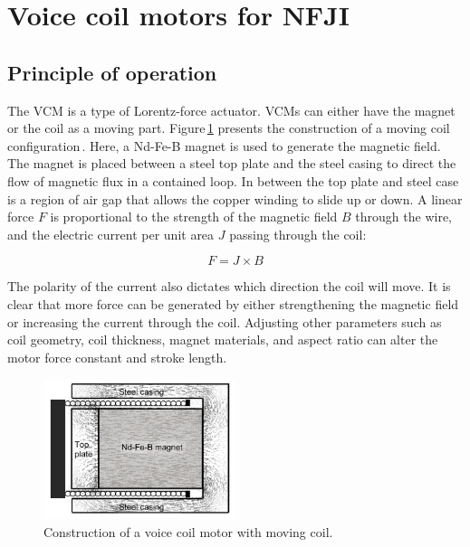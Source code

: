 \section{Voice coil motors for \acs{NFJI}}          \label{Chapter:background/voice coil motors for NFJI}
    
    
    \subsection{Principle of operation}             \label{Chapter:background/voice coil motors for NFJI/principle}


    The \ac{VCM} is a type of Lorentz-force actuator. \acsp{VCM} can either have the magnet or the coil as a moving part. Figure\,\ref{fig:chapter/background/vcm cut view} presents the construction of a moving coil configuration\,\cite{taberner2006}. Here, a Nd-Fe-B magnet is used to generate the magnetic field. The magnet is placed between a steel top plate and the steel casing to direct the flow of magnetic flux in a contained loop. In between the top plate and steel case is a region of air gap that allows the copper winding to slide up or down. A linear force $F$ is proportional to the strength of the magnetic field $B$ through the wire, and the electric current per unit area $J$ passing through the coil:
    
    
    \begin{equation}
        F=J\times B
        \label{eq:force produce via field and current}
    \end{equation}

    The polarity of the current also dictates which direction the coil will move. It is clear that more force can be generated by either strengthening the magnetic field or increasing the current through the coil. Adjusting other parameters such as coil geometry, coil thickness, magnet materials, and aspect ratio can alter the motor force constant and stroke length.
    
    
    \begin{figure}[!ht]
      \centering
      \includegraphics[width=0.5\textwidth]{chap2/images/vcm_cut_view.png}
      \caption{Construction of a voice coil motor with moving coil.}
      \label{fig:chapter/background/vcm cut view}
    \end{figure}
    
